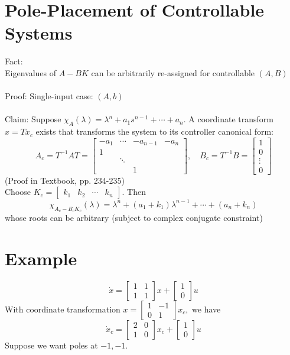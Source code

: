 \documentclass[10pt,a4paper,oneside]{article}
\begin{document}
\section{Pole-Placement of Controllable Systems}
Fact:\\
Eigenvalues of $A-BK$ can be arbitrarily re-assigned for controllable $(A,B)$\\
\\
Proof: Single-input case: $(A,b)$\\
\\Claim: Suppose $\chi_{A}(\lambda)=\lambda^{n}+a_{1} s^{n-1}+\cdots+a_{n}$. A coordinate transform
\\
$x=Tx_c$ exists that transforms the system to its controller canonical form:
\[
A_{c}=T^{-1} A T=\left[\begin{array}{cccc}{-a_{1}} & {\cdots} & {-a_{n-1}} & {-a_{n}} \\ {1} & {} & {} &{}\\ {} & {\ddots} & {} &{}\\{} & {} & {1} & {}\end{array}\right], \quad B_{c}=T^{-1} B=\left[\begin{array}{c}{1} \\ {0} \\ {\vdots} \\ {0}\end{array}\right]
\]
(Proof in Textbook, pp. 234-235)\\
Choose $K_{c}=\left[\begin{array}{llll}{k_{1}} & {k_{2}} & {\cdots} & {k_{n}}\end{array}\right]$. Then
\[
\chi_{A_{c}-B_{c} K_{c}}(\lambda)=\lambda^{n}+\left(a_{1}+k_{1}\right) \lambda^{n-1}+\cdots+\left(a_{n}+k_{n}\right)
\]
whose roots can be arbitrary (subject to complex conjugate constraint)
\section{Example}
\[
\dot{x}=\left[\begin{array}{ll}{1} & {1} \\ {1} & {1}\end{array}\right] x+\left[\begin{array}{l}{1} \\ {0}\end{array}\right] u
\]
With coordinate transformation $x=\left[\begin{array}{cc}{1} & {-1} \\ {0} & {1}\end{array}\right] x_{c},$ we have
\[
\dot{x}_{c}=\left[\begin{array}{ll}{2} & {0} \\ {1} & {0}\end{array}\right] x_{c}+\left[\begin{array}{l}{1} \\ {0}\end{array}\right] u
\]
Suppose we want poles at $-1,-1$.
\end{document}
